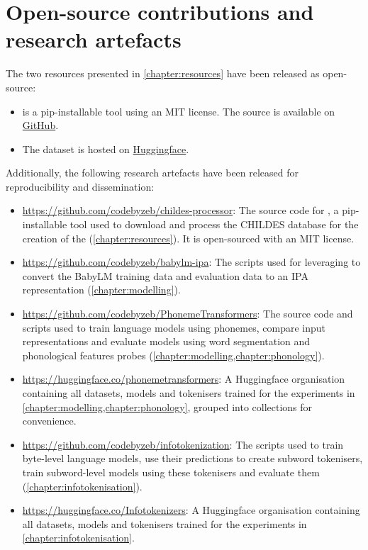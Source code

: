 \section{Open-source contributions and research artefacts}

The two resources presented in \cref{chapter:resources} have been released as open-source:

\begin{itemize}
\item \gpp is a pip-installable tool using an MIT license. The source is available on \href{https://github.com/codebyzeb/g2p-plus}{GitHub}. 
\item The \ipachildes dataset is hosted on \href{https://huggingface.co/datasets/phonemetransformers/IPA-CHILDES}{Huggingface}.
\end{itemize}

Additionally, the following research artefacts have been released for reproducibility and dissemination:

\begin{itemize}
    \item \href{https://github.com/codebyzeb/childes-processor}{https://github.com/codebyzeb/childes-processor}: The source code for \childesprocessor, a pip-installable tool used to download and process the CHILDES database for the creation of the \ipachildes (\cref{chapter:resources}). It is open-sourced with an MIT license.
    \item \href{https://github.com/codebyzeb/babylm-ipa}{https://github.com/codebyzeb/babylm-ipa}: The scripts used for leveraging \gpp to convert the BabyLM training data and evaluation data to an IPA representation (\cref{chapter:modelling}).
    \item \href{https://github.com/codebyzeb/PhonemeTransformers}{https://github.com/codebyzeb/PhonemeTransformers}: The source code and scripts used to train language models using phonemes, compare input representations and evaluate models using word segmentation and phonological features probes (\cref{chapter:modelling,chapter:phonology}). 
    \item \href{https://huggingface.co/phonemetransformers}{https://huggingface.co/phonemetransformers}: A Huggingface organisation containing all datasets, models and tokenisers trained for the experiments in \cref{chapter:modelling,chapter:phonology}, grouped into collections for convenience.
    \item \href{https://github.com/codebyzeb/infotokenization}{https://github.com/codebyzeb/infotokenization}: The scripts used to train byte-level language models, use their predictions to create subword tokenisers, train subword-level models using these tokenisers and evaluate them (\cref{chapter:infotokenisation}).
    \item \href{https://huggingface.co/Infotokenizers}{https://huggingface.co/Infotokenizers}: A Huggingface organisation containing all datasets, models and tokenisers trained for the experiments in \cref{chapter:infotokenisation}.
\end{itemize}

